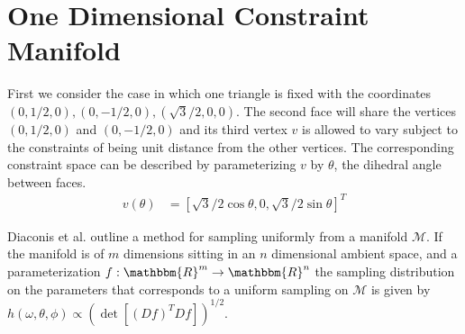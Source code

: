 \documentclass[12pt]{article}
\begin{document}
\maketitle

\section{One Dimensional Constraint Manifold}
First we consider the case in which one triangle is fixed with the coordinates $(0, 1/2, 0), (0, -1/2, 0), (\sqrt{3}/2, 0, 0)$. The second face will share the vertices $(0, 1/2, 0)$ and $(0, -1/2, 0)$ and its third vertex $v$ is allowed to vary subject to the constraints of being unit distance from the other vertices. The corresponding constraint space can be described by parameterizing $v$ by $\theta$, the dihedral angle between faces.
\begin{align}
v(\theta) &= \left[\sqrt{3}/2\cos\theta, 0, \sqrt{3}/2\sin\theta\right]^T
\end{align}

Diaconis et al. outline a method for sampling uniformly from a manifold $\mathcal{M}$. If the manifold is of $m$ dimensions sitting in an $n$ dimensional ambient space, and a parameterization $f: \mathbbm{R}^m \to \mathbbm{R}^n$ the sampling distribution on the parameters that corresponds to a uniform sampling on $\mathcal{M}$ is given by $h(\omega, \theta, \phi) \propto \left(\det\left[(Df)^TDf\right]\right)^{1/2}$.
\end{document}
